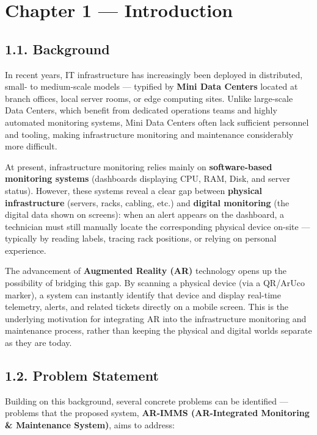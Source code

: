\documentclass[12pt]{article}
\begin{document}
\section*{Chapter 1 --- Introduction}

\subsection*{1.1. Background}

In recent years, IT infrastructure has increasingly been deployed in distributed, small- to medium-scale models --- typified by \textbf{Mini Data Centers} located at branch offices, local server rooms, or edge computing sites. Unlike large-scale Data Centers, which benefit from dedicated operations teams and highly automated monitoring systems, Mini Data Centers often lack sufficient personnel and tooling, making infrastructure monitoring and maintenance considerably more difficult.

At present, infrastructure monitoring relies mainly on \textbf{software-based monitoring systems} (dashboards displaying CPU, RAM, Disk, and server status). However, these systems reveal a clear gap between \textbf{physical infrastructure} (servers, racks, cabling, etc.) and \textbf{digital monitoring} (the digital data shown on screens): when an alert appears on the dashboard, a technician must still manually locate the corresponding physical device on-site --- typically by reading labels, tracing rack positions, or relying on personal experience.

The advancement of \textbf{Augmented Reality (AR)} technology opens up the possibility of bridging this gap. By scanning a physical device (via a QR/ArUco marker), a system can instantly identify that device and display real-time telemetry, alerts, and related tickets directly on a mobile screen. This is the underlying motivation for integrating AR into the infrastructure monitoring and maintenance process, rather than keeping the physical and digital worlds separate as they are today.

\subsection*{1.2. Problem Statement}

Building on this background, several concrete problems can be identified --- problems that the proposed system, \textbf{AR-IMMS (AR-Integrated Monitoring \& Maintenance System)}, aims to address:
\end{document}
